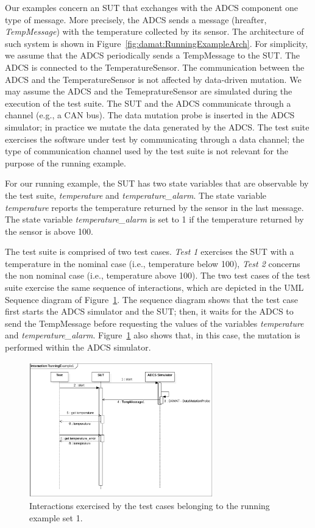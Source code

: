 Our examples concern an SUT that exchanges with the ADCS component one type of message. More precisely, the ADCS sends a message (hreafter, \emph{TempMessage}) with the temperature collected by its sensor. The architecture of such system is shown in Figure~\ref{fig:damat:RunningExampleArch}. For simplicity, we assume that the ADCS periodically sends a TempMessage to the SUT. The ADCS is connected to the TemperatureSensor. The communication between the ADCS and the TemperatureSensor is not affected by data-driven mutation. We may assume the ADCS and the TemepratureSensor are simulated during the execution of the test suite. The SUT and the ADCS communicate through a channel 
(e.g., a CAN bus). The data mutation probe is inserted in the ADCS simulator; in practice we mutate the data generated by the ADCS. The test suite exercises the software under test by communicating through a data channel; the type of communication channel used by the test suite is not relevant for the purpose of the running example.

For our running example, the SUT has two state variables that are observable by the test suite, \emph{temperature} and \emph{temperature\_alarm}. The state variable \emph{temperature} reports the temperature returned by the sensor in the last message. 
The state variable \emph{temperature\_alarm} is set to 1 if the temperature returned by the sensor is above 100.

The test suite is comprised of two test cases. \emph{Test 1} exercises the SUT with a temperature in the nominal case (i.e., temperature below 100), \emph{Test 2} concerns the non nominal case (i.e., temperature above 100). The two test cases of the test suite exercise the same sequence of interactions, which are depicted in the UML Sequence diagram of Figure~\ref{fig:damat:RunningExample1Sequence}. The sequence diagram shows that the test case first starts the ADCS simulator and the SUT; then, it waits for the ADCS to send the TempMessage before requesting the values of the variables \emph{temperature} and \emph{temperature\_alarm}. Figure~\ref{fig:damat:RunningExample1Sequence} also shows that, in this case, the mutation is performed within the ADCS simulator.

\begin{figure}[tb]
\centering
\includegraphics[width=8cm]{damat/images/runningExamplesSequence1.png}
\caption{Interactions exercised by the test cases belonging to the running example set 1.}
\label{fig:damat:RunningExample1Sequence}
\end{figure}


